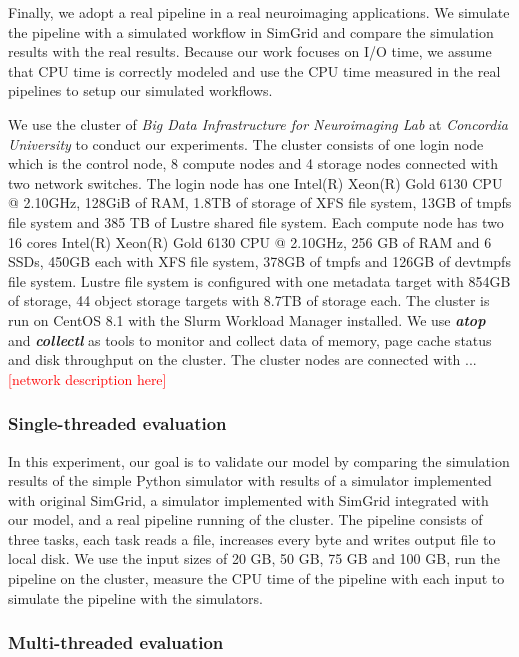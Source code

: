 \documentclass[conference]{IEEEtran}
\begin{document}
		    Finally, we adopt a real pipeline in a real neuroimaging applications. 
		    We simulate the pipeline with a simulated workflow in SimGrid 
			and compare the simulation results with the real results. 
			Because our work focuses on I/O time, we assume that CPU time is 
			correctly modeled and use the CPU time measured in the real pipelines 
			to setup our simulated workflows. 
			
			We use the cluster of \textit{Big Data Infrastructure for Neuroimaging Lab} 
			at \textit{Concordia University} to conduct our experiments. The cluster 
			consists of one login node which is the control node, 8 compute nodes 
			and 4 storage nodes connected with two network switches. The login node 
			has one Intel(R) Xeon(R) Gold 6130 CPU @ 2.10GHz, 128GiB of RAM, 1.8TB 
			of storage of XFS file system, 13GB of tmpfs file system and 385 TB of 
			Lustre shared file system. Each compute node has two 16 cores Intel(R) 
			Xeon(R) Gold 6130 CPU @ 2.10GHz, 256 GB of RAM and 6 SSDs, 450GB each 
			with XFS file system, 378GB of tmpfs and 126GB of devtmpfs file system.
			Lustre file system is configured with one metadata target with 854GB 
			of storage, 44 object storage targets with 8.7TB of storage each. 
			The cluster is run on CentOS 8.1 with the Slurm Workload Manager installed. We use 
			\textbf{\textit{atop}} and \textbf{\textit{collectl}} as tools to monitor 
			and collect data of memory, page cache status and disk throughput on 
			the cluster. The cluster nodes are connected with ... 
			\textcolor{red}{[network description here]}
	
			\subsubsection{Single-threaded evaluation}

				In this experiment, our goal is to validate our model by comparing 
				the simulation results of the simple Python simulator with results of 
				a simulator implemented with original SimGrid, a simulator 
				implemented with SimGrid integrated with our model, and a real pipeline 
				running of the cluster. 
				The pipeline consists of three tasks, each task reads a file, 
				increases every byte and writes output file to local disk. 
				We use the input sizes of 20 GB, 50 GB, 75 GB and 100 GB, run 
				the pipeline on the cluster, measure the CPU time of the pipeline 
				with each input to simulate the pipeline with the simulators.

			\subsubsection{Multi-threaded evaluation}
\end{document}
